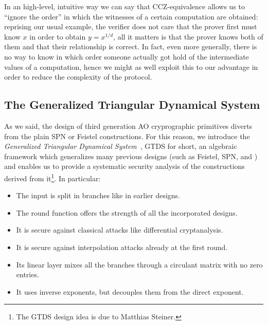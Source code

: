 In an high-level, intuitive way we can say that CCZ-equivalence allows us to ``ignore the order'' 
in which the witnesses of a certain computation are obtained: reprising our usual example,
the verifier does not care that the prover first must know \(x\) in order to obtain \(y = x^{1/d}\), 
all it matters is that the prover knows both of them and that their relationship is correct.
In fact, even more generally, there is no way to know in which order someone actually got hold of 
the intermediate values of a computation, hence we might as well exploit this to our advantage in 
order to reduce the complexity of the protocol.

\subsection{The Generalized Triangular Dynamical System}
As we said, the design of third generation AO cryprographic primitives diverts from the plain 
SPN or Feistel constructions.
For this reason, we introduce the \emph{Generalized Triangular Dynamical System}~\cite{RoyS2022}, 
GTDS for short, an algebraic framework which generalizes many previous designs (such as Feistel, 
SPN, and \Horst) and enables us to provide a systematic security analysis 
of the constructions derived from it\footnote{The GTDS design idea is due to Matthias Steiner.}.
In particular:
\begin{itemize}
  \item The input is split in branches like in earlier designs.
  \item The round function offers the strength of all the incorporated designs.
  \item It is secure against classical attacks like differential cryptanalysis.
  \item It is secure against interpolation attacks already at the first round.
  \item Its linear layer mixes all the branches through a circulant matrix with no zero entries.  
  \item It uses inverse exponents, but decouples them from the direct exponent. 
\end{itemize}

